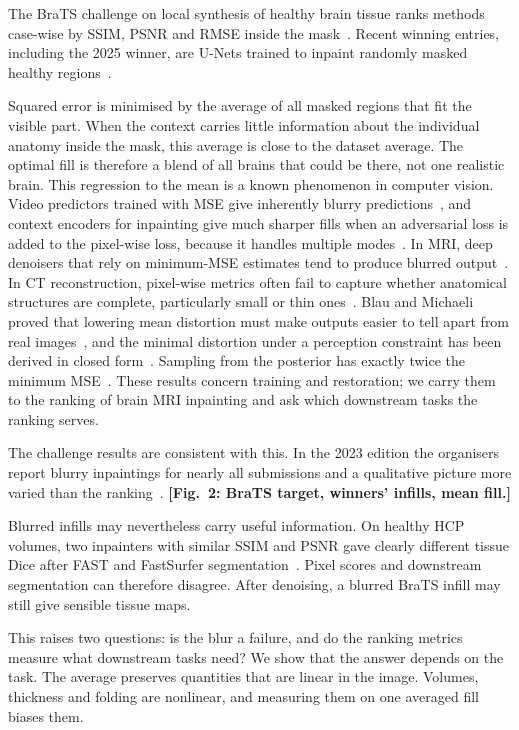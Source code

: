 \documentclass{article}
\newcommand{\todo}[1]{\textbf{[#1]}}
\begin{document}
The BraTS challenge on local synthesis of healthy brain tissue ranks methods case-wise by SSIM, PSNR and RMSE inside the mask~\cite{kofler2023brats,inpainting2026}.
Recent winning entries, including the 2025 winner, are U-Nets trained to inpaint randomly masked healthy regions~\cite{zhang2024brats,zhang2025brats}.

Squared error is minimised by the average of all masked regions that fit the visible part.
When the context carries little information about the individual anatomy inside the mask, this average is close to the dataset average.
The optimal fill is therefore a blend of all brains that could be there, not one realistic brain.
This regression to the mean is a known phenomenon in computer vision.
Video predictors trained with MSE give inherently blurry predictions~\cite{mathieu2016}, and context encoders for inpainting give much sharper fills when an adversarial loss is added to the pixel-wise loss, because it handles multiple modes~\cite{pathak2016}.
In MRI, deep denoisers that rely on minimum-MSE estimates tend to produce blurred output~\cite{chung2023}.
In CT reconstruction, pixel-wise metrics often fail to capture whether anatomical structures are complete, particularly small or thin ones~\cite{lin2025care}.
Blau and Michaeli proved that lowering mean distortion must make outputs easier to tell apart from real images~\cite{blau2018}, and the minimal distortion under a perception constraint has been derived in closed form~\cite{freirich2021}.
Sampling from the posterior has exactly twice the minimum MSE~\cite{blau2018,ohayon2025}.
These results concern training and restoration; we carry them to the ranking of brain MRI inpainting and ask which downstream tasks the ranking serves.

The challenge results are consistent with this.
In the 2023 edition the organisers report blurry inpaintings for nearly all submissions and a qualitative picture more varied than the ranking~\cite{kofler2023brats}.
\todo{Fig.~2: BraTS target, winners' infills, mean fill.}

Blurred infills may nevertheless carry useful information.
On healthy HCP volumes, two inpainters with similar SSIM and PSNR gave clearly different tissue Dice after FAST and FastSurfer segmentation~\cite{kwark2025,henschel2020}.
Pixel scores and downstream segmentation can therefore disagree.
After denoising, a blurred BraTS infill may still give sensible tissue maps.

This raises two questions: is the blur a failure, and do the ranking metrics measure what downstream tasks need?
We show that the answer depends on the task.
The average preserves quantities that are linear in the image.
Volumes, thickness and folding are nonlinear, and measuring them on one averaged fill biases them.
\end{document}
